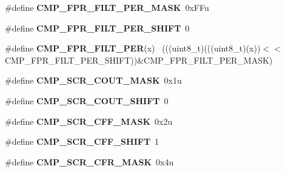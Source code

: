\begin{DoxyCompactItemize}
\item 
\hypertarget{group___c_m_p___register___masks_gaf8ca758656c156ecadfbb6f9e57a3eef}{}\#define {\bfseries C\+M\+P\+\_\+\+F\+P\+R\+\_\+\+F\+I\+L\+T\+\_\+\+P\+E\+R\+\_\+\+M\+A\+S\+K}~0x\+F\+Fu\label{group___c_m_p___register___masks_gaf8ca758656c156ecadfbb6f9e57a3eef}

\item 
\hypertarget{group___c_m_p___register___masks_gaa563be7a82c0c1e3802e7ac7c920bf3a}{}\#define {\bfseries C\+M\+P\+\_\+\+F\+P\+R\+\_\+\+F\+I\+L\+T\+\_\+\+P\+E\+R\+\_\+\+S\+H\+I\+F\+T}~0\label{group___c_m_p___register___masks_gaa563be7a82c0c1e3802e7ac7c920bf3a}

\item 
\hypertarget{group___c_m_p___register___masks_ga64552c5393c5361b4e87fae0df10308e}{}\#define {\bfseries C\+M\+P\+\_\+\+F\+P\+R\+\_\+\+F\+I\+L\+T\+\_\+\+P\+E\+R}(x)                                        ~(((uint8\+\_\+t)(((uint8\+\_\+t)(x))$<$$<$C\+M\+P\+\_\+\+F\+P\+R\+\_\+\+F\+I\+L\+T\+\_\+\+P\+E\+R\+\_\+\+S\+H\+I\+F\+T))\&C\+M\+P\+\_\+\+F\+P\+R\+\_\+\+F\+I\+L\+T\+\_\+\+P\+E\+R\+\_\+\+M\+A\+S\+K)\label{group___c_m_p___register___masks_ga64552c5393c5361b4e87fae0df10308e}

\item 
\hypertarget{group___c_m_p___register___masks_ga024aec72a28ecdc04a1441cd7a3af23a}{}\#define {\bfseries C\+M\+P\+\_\+\+S\+C\+R\+\_\+\+C\+O\+U\+T\+\_\+\+M\+A\+S\+K}~0x1u\label{group___c_m_p___register___masks_ga024aec72a28ecdc04a1441cd7a3af23a}

\item 
\hypertarget{group___c_m_p___register___masks_gaa508076192a6b9aed5c4d46282c64394}{}\#define {\bfseries C\+M\+P\+\_\+\+S\+C\+R\+\_\+\+C\+O\+U\+T\+\_\+\+S\+H\+I\+F\+T}~0\label{group___c_m_p___register___masks_gaa508076192a6b9aed5c4d46282c64394}

\item 
\hypertarget{group___c_m_p___register___masks_gaab44e3da0576b12dd809881323944a1c}{}\#define {\bfseries C\+M\+P\+\_\+\+S\+C\+R\+\_\+\+C\+F\+F\+\_\+\+M\+A\+S\+K}~0x2u\label{group___c_m_p___register___masks_gaab44e3da0576b12dd809881323944a1c}

\item 
\hypertarget{group___c_m_p___register___masks_ga076d455f0d5bdad02282cbcce6e04c01}{}\#define {\bfseries C\+M\+P\+\_\+\+S\+C\+R\+\_\+\+C\+F\+F\+\_\+\+S\+H\+I\+F\+T}~1\label{group___c_m_p___register___masks_ga076d455f0d5bdad02282cbcce6e04c01}

\item 
\hypertarget{group___c_m_p___register___masks_ga876bfa2799338c6b10b152940d25c4a7}{}\#define {\bfseries C\+M\+P\+\_\+\+S\+C\+R\+\_\+\+C\+F\+R\+\_\+\+M\+A\+S\+K}~0x4u\label{group___c_m_p___register___masks_ga876bfa2799338c6b10b152940d25c4a7}


\end{DoxyCompactItemize}
